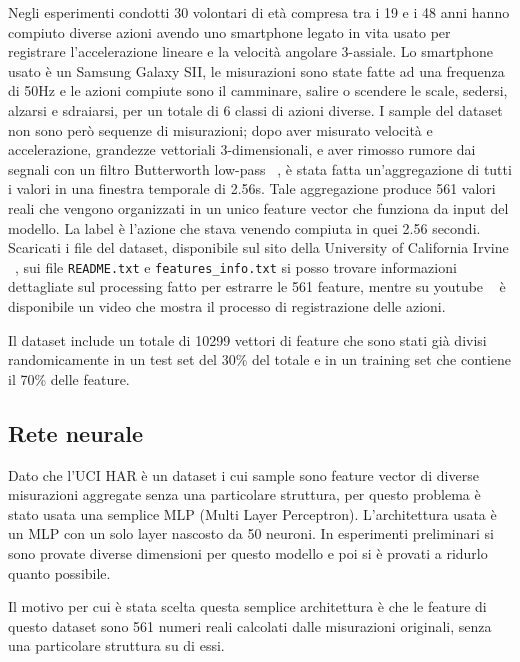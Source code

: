 Negli esperimenti condotti 30 volontari di età compresa tra i 19 e i 48 anni
hanno compiuto diverse azioni avendo uno smartphone legato in vita 
usato per registrare l'accelerazione lineare e la velocità 
angolare 3-assiale. Lo smartphone usato è un Samsung Galaxy SII, le 
misurazioni sono state fatte ad una frequenza di 50Hz e le azioni compiute
sono il camminare, salire o scendere le scale, sedersi, alzarsi e 
sdraiarsi, per un totale di 6 classi di azioni diverse.
I sample del dataset non sono però sequenze di misurazioni; dopo 
aver misurato velocità e accelerazione, grandezze vettoriali 3-dimensionali,
e aver rimosso rumore dai segnali con un filtro Butterworth low-pass 
~\cite{butterworth_filter}, è stata fatta un'aggregazione di tutti i 
valori in una finestra temporale di 2.56s. Tale aggregazione produce 
561 valori reali che vengono organizzati in un unico feature vector 
che funziona da input del modello. La label è l'azione che stava venendo
compiuta in quei 2.56 secondi.
Scaricati i file del dataset, disponibile sul sito della 
University of California Irvine ~\cite{uci_har_ds}, sui file 
\texttt{README.txt} e \texttt{features\_info.txt}
si posso trovare informazioni dettagliate sul 
processing fatto per estrarre le 561 feature, mentre su youtube 
~\cite{har_measuring_video} è disponibile un video che mostra il 
processo di registrazione delle azioni.

Il dataset include un totale di 10299 vettori di feature che sono stati
già divisi randomicamente 
in un test set del 30\% del totale e in un training set 
che contiene il 70\% delle feature.


\subsection{Rete neurale}
Dato che l'UCI HAR è un dataset i cui sample sono feature vector di 
diverse misurazioni aggregate senza una particolare struttura, per 
questo problema è stato usata una semplice MLP (Multi Layer Perceptron).
L'architettura usata è un MLP con un solo 
layer nascosto da 50 neuroni. In esperimenti preliminari si sono provate 
diverse dimensioni per questo modello e poi si è provati a ridurlo 
quanto possibile.

Il motivo per cui è stata scelta questa semplice architettura è che 
le feature di questo dataset sono 561 numeri reali calcolati dalle 
misurazioni originali, senza una particolare struttura su di essi.